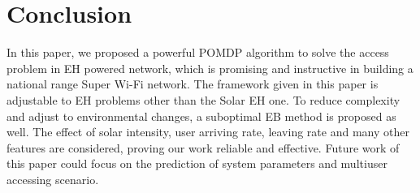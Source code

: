 \documentclass[journal,12pt,draftclsnofoot,onecolumn]{IEEEtran}
\begin{document}
\section{Conclusion}
In this paper, we proposed a powerful POMDP algorithm to solve the access problem in EH powered network,
which is promising and instructive in building a national range Super Wi-Fi network.
The framework given in this paper is adjustable to EH problems other than the Solar EH one.
To reduce complexity and adjust to environmental changes, a suboptimal EB method is proposed as well.
The effect of solar intensity, user arriving rate, leaving rate and many other features are considered,
proving our work reliable and effective.
Future work of this paper could focus on the prediction of system parameters and multiuser accessing scenario.


\end{document}
